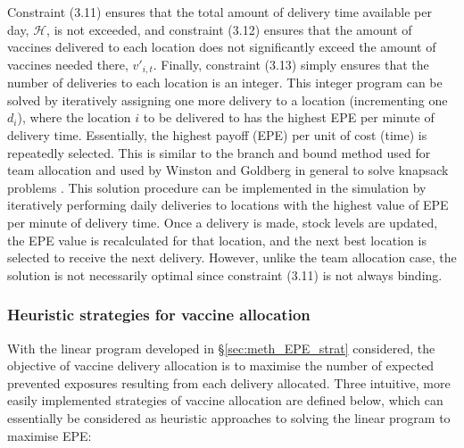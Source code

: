 Constraint (3.11) ensures that the total amount of delivery time available per day, $\mathcal{H}$, is not exceeded, and constraint (3.12) ensures that the amount of vaccines delivered to each location does not significantly exceed the amount of vaccines needed there, $v'_{i,t}$. Finally, constraint (3.13) simply ensures that the number of deliveries to each location is an integer.
This integer program can be solved by iteratively assigning one more delivery to a location (incrementing one $d_{i}$), where the location $i$ to be delivered to has the highest EPE per minute of delivery time. Essentially, the highest payoff (EPE) per unit of cost (time) is repeatedly selected. This is similar to the branch and bound method used for team allocation and used by Winston and Goldberg in general to solve knapsack problems \cite{winston2004operations}. This solution procedure can be implemented in the simulation by iteratively performing daily deliveries to locations with the highest value of EPE per minute of delivery time. Once a delivery is made, stock levels are updated, the EPE value is recalculated for that location, and the next best location is selected to receive the next delivery. However, unlike the team allocation case, the solution is not necessarily optimal since constraint (3.11) is not always binding.

\subsubsection{Heuristic strategies for vaccine allocation}
\label{sec:meth_delAccHeur}
With the linear program developed in \S \ref{sec:meth_EPE_strat} considered, the objective of vaccine delivery allocation is to maximise the number of expected prevented exposures resulting from each delivery allocated. Three intuitive, more easily implemented strategies of vaccine allocation are defined below, which can essentially be considered as heuristic approaches to solving the linear program to maximise EPE:

